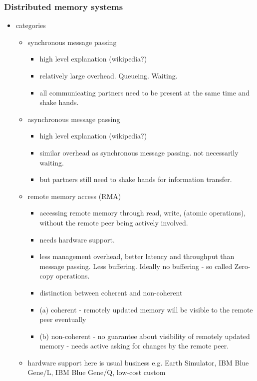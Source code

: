 \documentclass[a4paper, 10pt]{article}
\begin{document}
\subsubsection{Distributed memory systems}
\label{sssec:existing-means-distributed}
\begin{itemize}
	\item categories
		\begin{itemize}
			\item synchronous message passing
				\begin{itemize}
					\item high level explanation (wikipedia?)
					\item relatively large overhead. Queueing. Waiting.
					\item all communicating partners need to be present at the same time and shake hands.
				\end{itemize}
			\item asynchronous message passing
				\begin{itemize}
					\item high level explanation (wikipedia?)
					\item similar overhead as synchronous message passing. not necessarily waiting.
					\item but partners still need to shake hands for information transfer.
				\end{itemize}
			\item remote memory access (RMA)
				\begin{itemize}
					\item accessing remote memory through read, write, (atomic operations), without the remote peer being actively involved.
					\item needs hardware support.
					\item less management overhead, better latency and throughput than message passing. Less buffering. Ideally no buffering - so called Zero-copy operations.
					\item distinction between coherent and non-coherent
					\item (a) coherent - remotely updated memory will be visible to the remote peer eventually
					\item (b) non-coherent - no guarantee about visibility of remotely updated memory - needs active asking for changes by the remote peer.
				\end{itemize}
			\item hardware support here is usual business e.g. Earth Simulator\cite{earthsimulator}, IBM Blue Gene/L\cite{bluegenel}, IBM Blue Gene/Q\cite{bluegeneq}, low-cost custom\cite{hoefler2006b}

\end{itemize}
\end{itemize}
\end{document}

